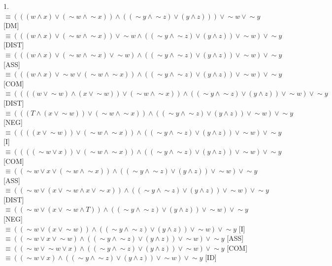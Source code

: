 \documentclass[a4paper, 20pt]{article}
\def\lnot{\mathop{\sim}}
\begin{document}
\begin{question}{1.}
\\ $\equiv (((w \land x)\lor(\lnot w \land \lnot x))\land((\lnot y \land \lnot z)\lor(y \land z)))\lor \lnot w \lor \lnot y$ [DM]
\\ $\equiv (((w \land x)\lor(\lnot w \land \lnot x))\lor \lnot w \land((\lnot y \land \lnot z)\lor(y \land z))\lor \lnot w ) \lor \lnot y$ [DIST]
\\ $\equiv (((w \land x)\lor(\lnot w \land \lnot x)\lor \lnot w) \land((\lnot y \land \lnot z)\lor(y \land z))\lor \lnot w ) \lor \lnot y$ [ASS]
\\ $\equiv (((w \land x)\lor \lnot w \lor (\lnot w \land \lnot x)) \land((\lnot y \land \lnot z)\lor(y \land z))\lor \lnot w ) \lor \lnot y$ [COM]
\\ $\equiv ((((w \lor \lnot w) \land (x \lor \lnot w)) \lor (\lnot w \land \lnot x)) \land((\lnot y \land \lnot z)\lor(y \land z))\lor \lnot w ) \lor \lnot y$ [DIST]
\\ $\equiv (((T \land (x \lor \lnot w)) \lor (\lnot w \land \lnot x)) \land((\lnot y \land \lnot z)\lor(y \land z))\lor \lnot w ) \lor \lnot y$ [NEG]
\\ $\equiv ((((x \lor \lnot w)) \lor (\lnot w \land \lnot x)) \land((\lnot y \land \lnot z)\lor(y \land z))\lor \lnot w ) \lor \lnot y$ [I]
\\ $\equiv ((((\lnot w \lor x)) \lor (\lnot w \land \lnot x)) \land((\lnot y \land \lnot z)\lor(y \land z))\lor \lnot w ) \lor \lnot y$ [COM]
\\ $\equiv ((\lnot w \lor x \lor (\lnot w \land \lnot x)) \land((\lnot y \land \lnot z)\lor(y \land z))\lor \lnot w ) \lor \lnot y$ [ASS]
\\ $\equiv ((\lnot w \lor (x \lor \lnot w \land x \lor \lnot x)) \land((\lnot y \land \lnot z)\lor(y \land z))\lor \lnot w ) \lor \lnot y$ [DIST]
\\ $\equiv ((\lnot w \lor (x \lor \lnot w \land T)) \land((\lnot y \land \lnot z)\lor(y \land z))\lor \lnot w ) \lor \lnot y$ [NEG]
\\ $\equiv ((\lnot w \lor (x \lor \lnot w)) \land((\lnot y \land \lnot z)\lor(y \land z))\lor \lnot w ) \lor \lnot y$ [I]
\\ $\equiv ((\lnot w \lor x \lor \lnot w) \land((\lnot y \land \lnot z)\lor(y \land z))\lor \lnot w ) \lor \lnot y$ [ASS]
\\ $\equiv ((\lnot w \lor \lnot w \lor x ) \land((\lnot y \land \lnot z)\lor(y \land z))\lor \lnot w ) \lor \lnot y$ [COM]
\\ $\equiv ((\lnot w \lor x ) \land((\lnot y \land \lnot z)\lor(y \land z))\lor \lnot w ) \lor \lnot y$ [ID]

\end{question}
\end{document}

